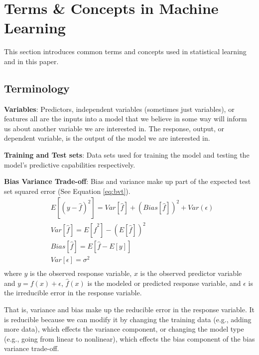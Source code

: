 \chapter{Terms \& Concepts in Machine Learning} \label{b:terms}
This section introduces common terms and concepts used in statistical learning and in this paper. 

\section*{Terminology}
\textbf{Variables}: Predictors, independent variables (sometimes just variables), or features all are the inputs into a model that we believe in some way will inform us about another variable we are interested in. The response, output, or dependent variable, is the output of the model we are interested in.

\textbf{Training and Test sets}: Data sets used for training the model and testing the model's predictive capabilities respectively. 

\textbf{Bias Variance Trade-off}: Bias and variance make up part of the expected test set squared error (See Equation \ref{eq:bvt}).
\begin{equation} 
	\label{eq:bvt}
	\begin{aligned}
		& E[(y-\hat{f})^2] = Var[\hat{f}] + (Bias[\hat{f}])^2 + Var(\epsilon) \\
		& Var[\hat{f}] = E[\hat{f}^2]-(E[\hat{f}])^2 \\
		& Bias[\hat{f}] = E[\hat{f}-E[y]] \\
		& Var[\epsilon] = \sigma^2 \\
	\end{aligned}
\end{equation}
where $y$ is the observed response variable, $x$ is the observed predictor variable and $y=f(x)+ \epsilon$, $\hat{f}(x)$ is the modeled or predicted response variable, and $\epsilon$ is the irreducible error in the response variable. 

That is, variance and bias make up the reducible error in the response variable. It is reducible because we can modify it by changing the training data (e.g., adding more data), which effects the variance component, or changing the model type (e.g., going from linear to nonlinear), which effects the bias component of the bias variance trade-off.
 
